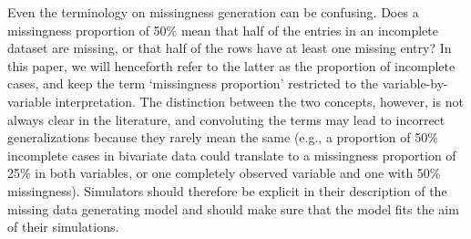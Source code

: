\documentclass[bimj,fleqn]{w-art}
\begin{document}

Even the terminology on missingness generation can be confusing. Does a missingness proportion of 50\% mean that half of the entries in an incomplete dataset are missing, or that half of the rows have at least one missing entry? In this paper, we will henceforth refer to the latter as the proportion of incomplete cases, and keep the term `missingness proportion' restricted to the variable-by-variable interpretation. The distinction between the two concepts, however, is not always clear in the literature, and convoluting the terms may lead to incorrect generalizations because they rarely mean the same (e.g., a proportion of 50\% incomplete cases in bivariate data could translate to a missingness proportion of 25\% in both variables, or one completely observed variable and one with 50\% missingness). Simulators should therefore be explicit in their description of the missing data generating model and should make sure that the model fits the aim of their simulations. 
\end{document}
